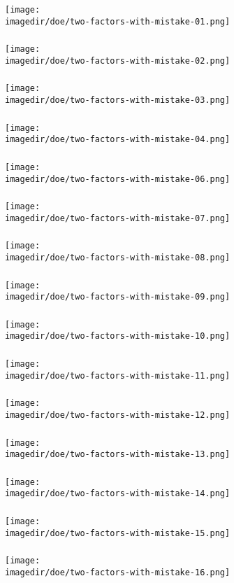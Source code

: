 \documentclass[handout,11pt,aspectratio=169,mathserif]{beamer}
\begin{document}
\begin{frame}\frametitle{}
	\centerline{\texttt{[image: \\imagedir/doe/two-factors-with-mistake-01.png]}}
\end{frame}
\begin{frame}\frametitle{}
	\centerline{\texttt{[image: \\imagedir/doe/two-factors-with-mistake-02.png]}}
\end{frame}
\begin{frame}\frametitle{}
	\centerline{\texttt{[image: \\imagedir/doe/two-factors-with-mistake-03.png]}}
\end{frame}
\begin{frame}\frametitle{}
	\centerline{\texttt{[image: \\imagedir/doe/two-factors-with-mistake-04.png]}}
\end{frame}
\begin{frame}\frametitle{}
	\centerline{\texttt{[image: \\imagedir/doe/two-factors-with-mistake-06.png]}}
\end{frame}
\begin{frame}\frametitle{}
	\centerline{\texttt{[image: \\imagedir/doe/two-factors-with-mistake-07.png]}}
\end{frame}
\begin{frame}\frametitle{}
	\centerline{\texttt{[image: \\imagedir/doe/two-factors-with-mistake-08.png]}}
\end{frame}
\begin{frame}\frametitle{}
	\centerline{\texttt{[image: \\imagedir/doe/two-factors-with-mistake-09.png]}}
\end{frame}
\begin{frame}\frametitle{}
	\centerline{\texttt{[image: \\imagedir/doe/two-factors-with-mistake-10.png]}}
\end{frame}
\begin{frame}\frametitle{}
	\centerline{\texttt{[image: \\imagedir/doe/two-factors-with-mistake-11.png]}}
\end{frame}
\begin{frame}\frametitle{}
	\centerline{\texttt{[image: \\imagedir/doe/two-factors-with-mistake-12.png]}}
\end{frame}
\begin{frame}\frametitle{}
	\centerline{\texttt{[image: \\imagedir/doe/two-factors-with-mistake-13.png]}}
\end{frame}
\begin{frame}\frametitle{}
	\centerline{\texttt{[image: \\imagedir/doe/two-factors-with-mistake-14.png]}}
\end{frame}
\begin{frame}\frametitle{}
	\centerline{\texttt{[image: \\imagedir/doe/two-factors-with-mistake-15.png]}}
\end{frame}
\begin{frame}\frametitle{}
	\centerline{\texttt{[image: \\imagedir/doe/two-factors-with-mistake-16.png]}}
\end{frame}
\end{document}
